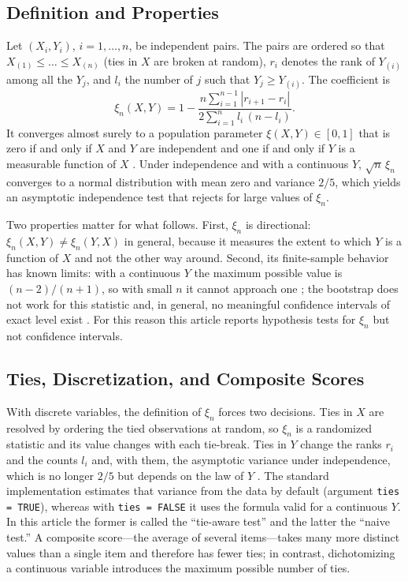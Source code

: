 \documentclass[man,mask,donotrepeattitle,floatsintext]{apa7}
\begin{document}
\subsection{Definition and Properties}

Let $(X_i,Y_i)$, $i=1,\dots,n$, be independent pairs. The pairs are ordered so that $X_{(1)}\le\dots\le X_{(n)}$ (ties in $X$ are broken at random), $r_i$ denotes the rank of $Y_{(i)}$ among all the $Y_j$, and $l_i$ the number of $j$ such that $Y_j\ge Y_{(i)}$. The coefficient is
\begin{equation}
\xi_n(X,Y) = 1 - \frac{n\sum_{i=1}^{n-1}|r_{i+1}-r_i|}{2\sum_{i=1}^{n} l_i\,(n-l_i)}.
\end{equation}
It converges almost surely to a population parameter $\xi(X,Y)\in[0,1]$ that is zero if and only if $X$ and $Y$ are independent and one if and only if $Y$ is a measurable function of $X$ \parencite{chatterjee2021}. Under independence and with a continuous $Y$, $\sqrt{n}\,\xi_n$ converges to a normal distribution with mean zero and variance $2/5$, which yields an asymptotic independence test that rejects for large values of $\xi_n$.

Two properties matter for what follows. First, $\xi_n$ is directional: $\xi_n(X,Y)\neq\xi_n(Y,X)$ in general, because it measures the extent to which $Y$ is a function of $X$ and not the other way around. Second, its finite-sample behavior has known limits: with a continuous $Y$ the maximum possible value is $(n-2)/(n+1)$, so with small $n$ it cannot approach one \parencite{dalitz2024}; the bootstrap does not work for this statistic \parencite{dalitz2024} and, in general, no meaningful confidence intervals of exact level exist \parencite{bucher2025}. For this reason this article reports hypothesis tests for $\xi_n$ but not confidence intervals.

\subsection{Ties, Discretization, and Composite Scores}

With discrete variables, the definition of $\xi_n$ forces two decisions. Ties in $X$ are resolved by ordering the tied observations at random, so $\xi_n$ is a randomized statistic and its value changes with each tie-break. Ties in $Y$ change the ranks $r_i$ and the counts $l_i$ and, with them, the asymptotic variance under independence, which is no longer $2/5$ but depends on the law of $Y$ \parencite{chatterjee2021}. The standard implementation \parencite{chatterjee2023xicor} estimates that variance from the data by default (argument \texttt{ties = TRUE}), whereas with \texttt{ties = FALSE} it uses the formula valid for a continuous $Y$. In this article the former is called the ``tie-aware test'' and the latter the ``naive test.'' A composite score---the average of several items---takes many more distinct values than a single item and therefore has fewer ties; in contrast, dichotomizing a continuous variable \parencite{maccallum2002} introduces the maximum possible number of ties.
\end{document}
